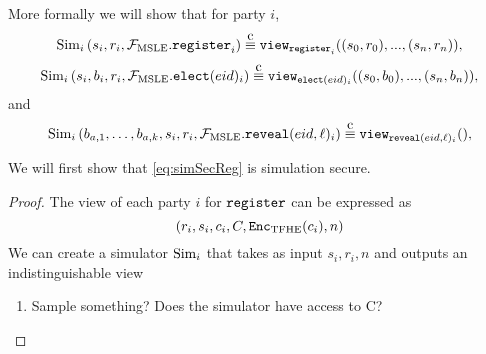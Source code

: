 More formally we will show that for party $i$,
\begin{equation}
	\label{eq:simSecReg}
	\simulator_i\left(s_i, r_i, \idealMSLE.\register_i\right) \compInd \texttt{view}_{\register_i}((s_0, r_0), ..., (s_n, r_n)),
\end{equation}
\begin{equation}
	\label{eq:simSecElect}
	\simulator_i\left(s_i, b_i, r_i, \idealMSLE.\elect_i\right) \compInd \texttt{view}_{\elect_i}((s_0, b_0), ..., (s_n, b_n)),
\end{equation}
and
\begin{equation}
	\label{eq:simSecReveal}
	\simulator_i\left(b_{a, 1}, \dots, b_{a, k}, s_i, r_i, \idealMSLE.\reveal_i\right) \compInd \texttt{view}_{\reveal_i}(),
\end{equation}

\begin{lemma}
	We will first show that \cref{eq:simSecReg} is simulation secure.
	\begin{proof}
		The view of each party $i$ for $\texttt{register}$ can be expressed as
		\begin{equation*}
			(r_i, s_i, c_i, C, \texttt{Enc}_{\mathrm{TFHE}}(c_i), n)
		\end{equation*}
		We can create a simulator $\text{Sim}_i$ that takes as input $s_i, r_i, n$ and outputs
		an indistinguishable view 
		\begin{enumerate}
			\item Sample something? Does the simulator have access to C?
		\end{enumerate}
	\end{proof}
\end{lemma}


